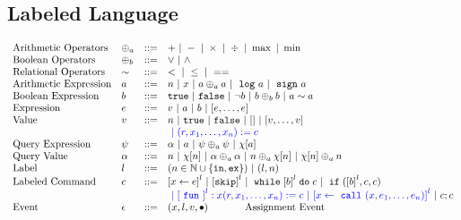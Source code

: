 %
%
\subsection{Labeled Language}
\[
\begin{array}{llll}
\mbox{Arithmetic Operators} 
& \oplus_a & ::= & + ~|~ - ~|~ \times 
%
~|~ \div ~|~ \max ~|~ \min\\  
\mbox{Boolean Operators} 
& \oplus_b & ::= & \lor ~|~ \land
\\
%
\mbox{Relational Operators} 
& \sim & ::= & < ~|~ \leq ~|~ == 
\\  
%
\mbox{Arithmetic Expression} 
& \aexpr & ::= & 
n ~|~ {x} ~|~ \aexpr \oplus_a \aexpr  
 ~|~ \elog \aexpr  ~|~ \esign \aexpr
\\
%
\mbox{Boolean Expression} & \bexpr & ::= & 
%
\etrue ~|~ \efalse  ~|~ \neg \bexpr
 ~|~ \bexpr \oplus_b \bexpr
%
~|~ \aexpr \sim \aexpr 
\\
%
\mbox{Expression} & \expr & ::= & v ~|~ \aexpr ~|~ \bexpr ~|~ [\expr, \dots, \expr]
\\  
%
\mbox{Value} 
& v & ::= & { n ~|~ \etrue ~|~ \efalse ~|~ [] ~|~ [v, \dots, v]}  
\\ 
&&&
\highlight
{
~|~ (r, x_1, \ldots, x_n) := c
}
\\
%
\mbox{Query Expression} 
& {\qexpr} & ::= 
& { \qval ~|~ \aexpr ~|~ \qexpr \oplus_a \qexpr ~|~ \chi[\aexpr]} 
\\
%
\mbox{Query Value} & \qval & ::= 
& {n ~|~ \chi[n] ~|~ \qval \oplus_a  \qval ~|~ n \oplus_a  \chi[n]
    ~|~ \chi[n] \oplus_a  n}
\\
\mbox{Label} 
& l & ::= & (n \in \mathbb{N} \cup \{\lin, \lex\}) ~|~ (l, n)
\\ 
%
\mbox{Labeled Command} 
& {c} & ::= &  
\clabel{\assign{x}{\expr}}^l 
~|~  \clabel{\eskip}^l
~|~ \ewhile \clabel{\bexpr}^{l} \edo {c}
~|~ \eif(\clabel{\bexpr}^{l} , {c}, {c}) 
\\ 
&&&
\highlight
{
~|~ \clabel{\efun}^l: x(r, x_1, \ldots, x_n) := c
~|~ \clabel{\assign{x}{\ecall(x, e_1, \ldots, e_n)}}^l
}
~|~ {c};{c}  
\\ 
\mbox{Event} 
& \event & ::= & 
({x}, l, v, \bullet)   ~~~~~~~~~~~ \mbox{Assignment Event} \\

\end{array}\]

